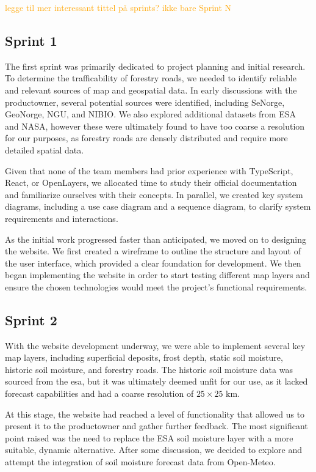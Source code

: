 \textcolor{orange}{legge til mer interessant tittel på sprints? ikke bare Sprint N}

\subsection*{Sprint 1}

The first sprint was primarily dedicated to project planning and initial research.  To determine the trafficability of forestry roads, we needed to identify reliable and relevant sources of map and geospatial data. In early discussions with the \gls{productowner}, several potential sources were identified, including SeNorge, GeoNorge, NGU, and NIBIO. We also explored additional datasets from ESA and NASA, however these were ultimately found to have too coarse a resolution for our purposes, as forestry roads are densely distributed and require more detailed spatial data.

Given that none of the team members had prior experience with TypeScript, React, or OpenLayers, we allocated time to study their official documentation and familiarize ourselves with their concepts. In parallel, we created key system diagrams, including a use case diagram and a sequence diagram, to clarify system requirements and interactions. 

As the initial work progressed faster than anticipated, we moved on to designing the website. We first created a wireframe to outline the structure and layout of the user interface, which provided a clear foundation for development. We then began implementing the website in order to start testing different map layers and ensure the chosen technologies would meet the project's functional requirements.

\subsection*{Sprint 2}

With the website development underway, we were able to implement several key map layers, including superficial deposits, frost depth, static soil moisture, historic soil moisture, and forestry roads. The historic soil moisture data was sourced from the \acrshort{esa}, but it was ultimately deemed unfit for our use, as it lacked forecast capabilities and had a coarse resolution of $25 \times 25\text{ km}$.

At this stage, the website had reached a level of functionality that allowed us to present it to the \gls{productowner} and gather further feedback. The most significant point raised was the need to replace the ESA soil moisture layer with a more suitable, dynamic alternative. After some discussion, we decided to explore and attempt the integration of soil moisture forecast data from Open-Meteo.

